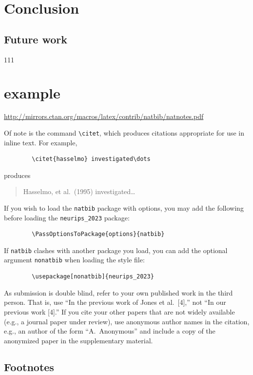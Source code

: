 \documentclass{article}
\begin{document}
	
	\section{Conclusion}
	\subsection{Future work}
111
	
\section{example}
	\begin{center}
		\url{http://mirrors.ctan.org/macros/latex/contrib/natbib/natnotes.pdf}
	\end{center}
	Of note is the command \verb+\citet+, which produces citations appropriate for
	use in inline text.  For example,
	\begin{verbatim}
		\citet{hasselmo} investigated\dots
	\end{verbatim}
	produces
	\begin{quote}
		Hasselmo, et al.\ (1995) investigated\dots
	\end{quote}
	
	
	If you wish to load the \verb+natbib+ package with options, you may add the
	following before loading the \verb+neurips_2023+ package:
	\begin{verbatim}
		\PassOptionsToPackage{options}{natbib}
	\end{verbatim}
	
	
	If \verb+natbib+ clashes with another package you load, you can add the optional
	argument \verb+nonatbib+ when loading the style file:
	\begin{verbatim}
		\usepackage[nonatbib]{neurips_2023}
	\end{verbatim}
	
	
	As submission is double blind, refer to your own published work in the third
	person. That is, use ``In the previous work of Jones et al.\ [4],'' not ``In our
	previous work [4].'' If you cite your other papers that are not widely available
	(e.g., a journal paper under review), use anonymous author names in the
	citation, e.g., an author of the form ``A.\ Anonymous'' and include a copy of the anonymized paper in the supplementary material.
	
	
	\subsection{Footnotes}
	
\end{document}

